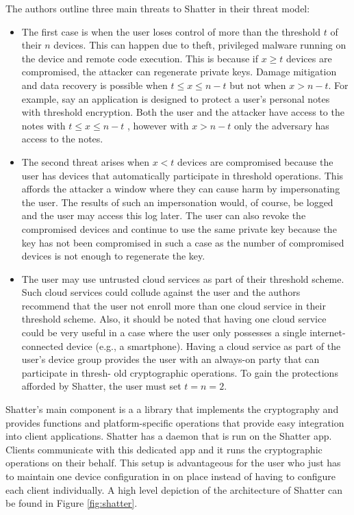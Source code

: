 The authors outline three main threats to Shatter in their threat model:
\begin{itemize}
	
	\item The first case is when the user loses control of more than the threshold $t$ of their $n$ devices. This can happen due to theft, privileged 			malware running on the device and remote code execution. This is because if $x\geq t$ devices are compromised, the attacker can regenerate 			private keys. Damage mitigation and data recovery is possible when $t\leq x\leq n - t$ but not when $x>n - t$. For example, say an application is 	designed to protect a user's personal notes with threshold encryption. Both the user and the attacker have access to the notes with $t\leq x\leq 		n - t$	, however with $x > n-t$ only the adversary has access to the notes.
	\item The second threat arises when $x < t$ devices are compromised because the user has devices that automatically participate in threshold 			operations. This affords the attacker a window where they can cause harm by impersonating the user. The results of such an impersonation 				would, of course, be logged and the user may access this log later. The user can also revoke the compromised devices and continue to use the 			same private key because the key has not been compromised in such a case as the number of compromised devices is not enough to regenerate 		the key.
	\item The user may use untrusted cloud services as part of their threshold scheme. Such cloud services could collude against the user and the 			authors recommend that the user not enroll more than one cloud service in their threshold scheme. Also, it should be noted that having one cloud 	service could be very useful in a case where the user only possesses a single internet-connected device (e.g., a smartphone). Having a cloud 				service as part of the user's device group provides the user with an always-on party that can participate in thresh- old cryptographic operations. 		To gain the protections afforded by Shatter, the user must  set $t = n = 2$.
\end{itemize}

Shatter's main component is a a library that implements the cryptography and provides functions and platform-specific operations that provide easy integration into client applications. Shatter has a daemon that is run on the Shatter app. Clients communicate with this dedicated app and it runs the cryptographic operations on their behalf. This setup is advantageous for the user who just has to maintain one device configuration in on place instead of having to configure each client individually. A high level depiction of the architecture of Shatter can be found in Figure \ref{fig:shatter}.

